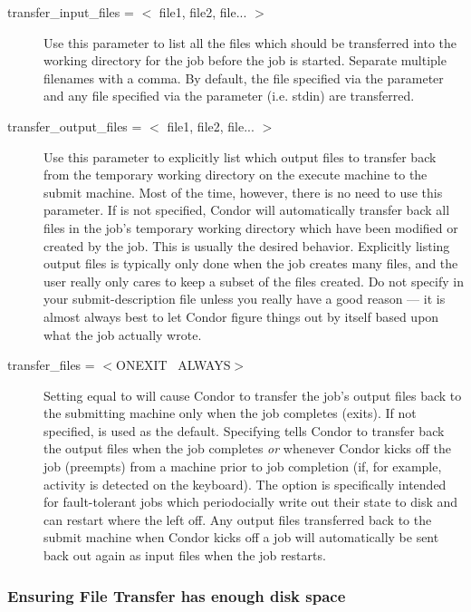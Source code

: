 \begin{description}

\item[transfer\_input\_files = $<$ file1, file2, file... $>$] Use this
parameter to list all the files which should be transferred into the 
working directory for the job before the job is started.  Separate multiple
filenames with a comma.  By default, the file specified via the
 parameter and any file specified via the 
parameter (i.e. stdin) are transferred.

\item[transfer\_output\_files = $<$ file1, file2, file... $>$] Use this
parameter to explicitly list which output files to transfer back from the
temporary working directory on the execute machine to the submit machine.
Most of the time, however, there is no need to use
this parameter.  If  is not
specified, Condor will automatically transfer back all files in the job's
temporary working directory which have been
modified or created by the job.  This is usually the desired behavior.
Explicitly listing output files is typically only done when the job creates
many files, and the user really only cares to keep a subset of
the files created. \Warn Do not specify  in your
submit-description file unless you really have a good reason --- it is
almost always best to let Condor figure things out by itself based upon what
the job actually wrote.

\item[transfer\_files = $<$ONEXIT \Bar\ ALWAYS$>$] Setting
 equal to  will cause Condor to transfer the
job's output files back to the submitting machine only when the job
completes (exits).  If not specified,  is used as the default.
Specifying  tells Condor to transfer back the output files when
the job completes \emph{or} whenever Condor kicks off the job (preempts)
from a machine prior to job completion (if, for example, activity is
detected on the keyboard).  The  option is specifically intended
for fault-tolerant jobs which periodocially write out their state to disk and
can restart where the left off.  Any output files transferred back to the
submit machine when Condor kicks off a job will automatically be sent back
out again as input files when the job restarts.

\end{description}

\subsubsection{Ensuring File Transfer has enough disk space}

